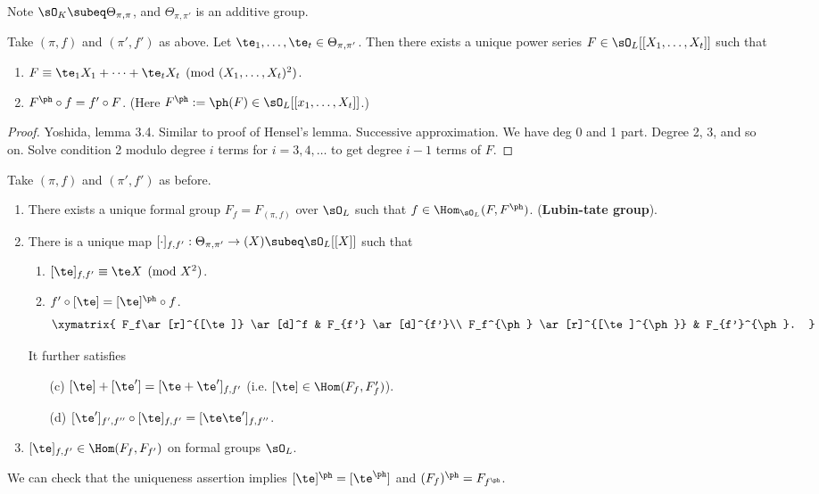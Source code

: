 Note $\sO_K\subeq \Theta_{\pi,\pi}$, and $\Theta_{\pi,\pi'}$ is an additive group.
\begin{lem}
Take $(\pi,f)$ and $(\pi',f')$ as above. Let $\te_1,\ldots,\te_t\in \Theta_{\pi,\pi'}$. Then there exists a unique power series $F\in \sO_L[[X_1,\ldots, X_t]]$ such that
\begin{enumerate}
\item
$F\equiv \te_1X_1+\cdots +\te_tX_t\pmod{(X_1,\ldots,X_t)^2}$.
\item 
$F^{\ph} \circ f=f'\circ F$. (Here $F^{\ph}:=\ph(F)\in \sO_L[[x_1,\ldots, X_t]]$.)
\end{enumerate}
\end{lem}
\begin{proof}
Yoshida, lemma 3.4. Similar to proof of Hensel's lemma. Successive approximation. We have deg 0 and 1 part. Degree 2, 3, and so on. Solve condition 2 modulo degree $i$ terms for $i=3,4,\ldots$ to get degree $i-1$ terms of $F$.
\end{proof}
\begin{pr}
Take $(\pi,f)$ and $(\pi',f')$ as before.
\begin{enumerate}
\item
There exists a unique formal group $F_f=F_{(\pi,f)}$ over $\sO_L$ such that $f\in \Hom_{\sO_L}(F,F^{\ph})$. (\textbf{Lubin-tate group}).
\item
There is a unique map $[\cdot]_{f,f'}:\Theta_{\pi,\pi'}\to (X)\subeq \sO_L[[X]]$ such that
\begin{enumerate}
\item
$[\te]_{f,f'}\equiv \te X\pmod{X^2}$.
\item
$f'\circ [\te] =[\te]^{\ph} \circ f$.
\[
\xymatrix{
F_f\ar[r]^{[\te]} \ar[d]^f & F_{f'} \ar[d]^{f'}\\
F_f^{\ph} \ar[r]^{[\te]^{\ph}} & F_{f'}^{\ph}.
}
\]
\end{enumerate}
It further satisfies
\begin{enumerate}
\item[(c)]
$[\te]+[\te']=[\te+\te']_{f,f'}$ (i.e. $[\te]\in \Hom(F_f,F_f')$).
\item[(d)]
$[\te']_{f',f''}\circ[\te]_{f,f'}=[\te\te']_{f,f''}$.
\end{enumerate}
\item $[\te]_{f,f'}\in \Hom(F_f,F_{f'})$ on formal groups $\sO_L$.
\end{enumerate}
\end{pr}
We can check that the uniqueness assertion implies $[\te]^{\ph}=[\te^{\ph}]$ and $(F_f)^{\ph} = F_{f^{\ph}}$.

